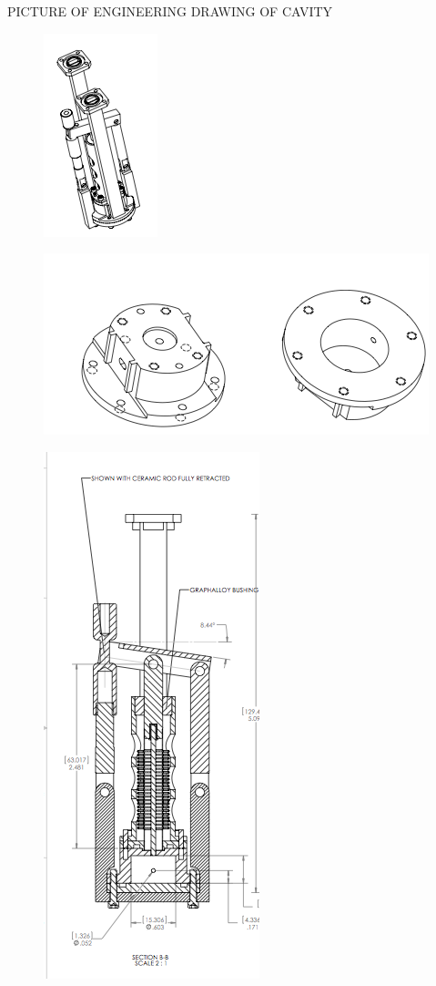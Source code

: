 \documentclass[11pt]{article}
\begin{document}
PICTURE OF ENGINEERING DRAWING OF CAVITY
\begin{figure}
\includegraphics[scale=1.4]{AxionDrawing3D}
\end{figure}

\begin{figure}
\includegraphics[scale=0.7]{AxionBody}
\end{figure}

\begin{figure}
\includegraphics[scale=0.7]{AxionEngineeringDrawing}
\end{figure}
\end{document}
